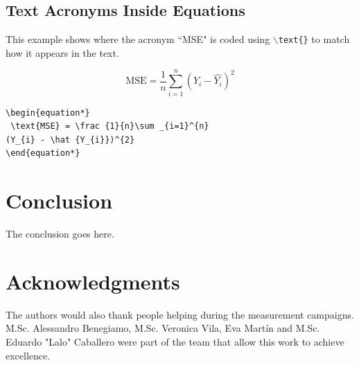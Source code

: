 \documentclass[lettersize,journal]{IEEEtran}
\begin{document}
\subsection{ Text Acronyms Inside Equations}
This example shows where the acronym ``MSE" is coded using $\backslash${\tt{text\{\}}} to match how it appears in the text.

\begin{equation*}
 \text{MSE} = \frac {1}{n}\sum _{i=1}^{n}(Y_{i} - \hat {Y_{i}})^{2}
\end{equation*}

\begin{verbatim}
\begin{equation*}
 \text{MSE} = \frac {1}{n}\sum _{i=1}^{n}
(Y_{i} - \hat {Y_{i}})^{2}
\end{equation*}
\end{verbatim}

\section{Conclusion}
The conclusion goes here.


\section*{Acknowledgments}
\label{sec:acks}
The authors would also thank people helping during the measurement campaigns. M.Sc. Alessandro Benegiamo, M.Sc. Veronica Vila, Eva Martín and M.Sc. Eduardo "Lalo" Caballero were part of the team that allow this work to achieve excellence.   





\end{document}
